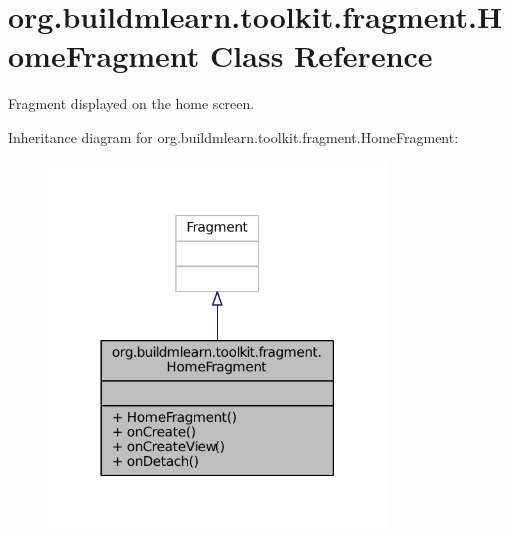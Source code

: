 \hypertarget{classorg_1_1buildmlearn_1_1toolkit_1_1fragment_1_1HomeFragment}{\section{org.\-buildmlearn.\-toolkit.\-fragment.\-Home\-Fragment Class Reference}
\label{classorg_1_1buildmlearn_1_1toolkit_1_1fragment_1_1HomeFragment}
}


Fragment displayed on the home screen.  




Inheritance diagram for org.\-buildmlearn.\-toolkit.\-fragment.\-Home\-Fragment\-:
\nopagebreak
\begin{figure}[H]
\begin{center}
\leavevmode
\includegraphics[width=254pt]{da/da2/classorg_1_1buildmlearn_1_1toolkit_1_1fragment_1_1HomeFragment__inherit__graph}
\end{center}
\end{figure}


